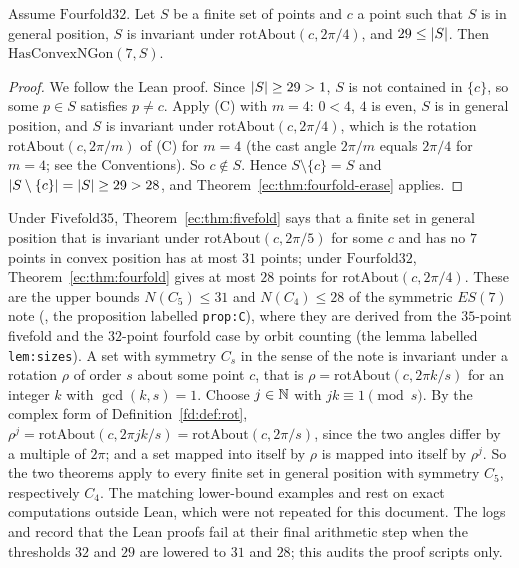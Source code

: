 \begin{theorem}\label{ec:thm:fourfold}
Assume $\mathrm{Fourfold32}$. Let $S$ be a finite set of points and $c$ a point such that $S$ is in general position,
$S$ is invariant under $\mathrm{rotAbout}(c,2\pi/4)$, and $29\le\lvert S\rvert$. Then $\mathrm{HasConvexNGon}(7,S)$.
\end{theorem}

\begin{proof}
We follow the Lean proof. Since $\lvert S\rvert\ge29>1$, $S$ is not contained in $\{c\}$, so some $p\in S$ satisfies $p\ne
c$. Apply (C) with $m=4$: $0<4$, $4$ is even, $S$ is in general position, and $S$ is invariant under
$\mathrm{rotAbout}(c,2\pi/4)$, which is the rotation $\mathrm{rotAbout}(c,2\pi/m)$ of (C) for $m=4$ (the cast angle
$2\pi/m$ equals $2\pi/4$ for $m=4$; see the Conventions). So $c\notin S$. Hence $S\setminus\{c\}=S$ and
$\lvert S\setminus\{c\}\rvert=\lvert S\rvert\ge29>28$, and
Theorem~\ref{ec:thm:fourfold-erase} applies.
\end{proof}

\begin{remark}\label{ec:rem:es7-sharp}
Under $\mathrm{Fivefold35}$, Theorem~\ref{ec:thm:fivefold} says that a finite set in general position that is
invariant under $\mathrm{rotAbout}(c,2\pi/5)$ for some $c$ and has no $7$ points in convex position has at most $31$
points; under $\mathrm{Fourfold32}$, Theorem~\ref{ec:thm:fourfold} gives at most $28$ points for
$\mathrm{rotAbout}(c,2\pi/4)$. These are the upper bounds $N(C_5)\le31$ and $N(C_4)\le28$ of the symmetric $ES(7)$
note (, the proposition labelled \texttt{prop:C}), where they are derived from
the $35$-point fivefold and the $32$-point fourfold case by orbit counting (the lemma labelled \texttt{lem:sizes}). A set
with symmetry $C_s$ in the sense of the note is invariant under a rotation $\rho$ of order $s$ about some point $c$,
that is $\rho=\mathrm{rotAbout}(c,2\pi k/s)$ for an integer $k$ with $\gcd(k,s)=1$. Choose $j\in\mathbb N$ with
$jk\equiv1\pmod s$. By the complex form of Definition~\ref{fd:def:rot},
$\rho^j=\mathrm{rotAbout}(c,2\pi jk/s)=\mathrm{rotAbout}(c,2\pi/s)$, since the two angles differ by a multiple of
$2\pi$; and a set mapped into itself by $\rho$ is mapped into itself by $\rho^j$. So the two theorems apply to every
finite set in general position with symmetry $C_5$, respectively $C_4$. The matching lower-bound examples  and
 rest on exact computations outside Lean, which were not repeated for this document. The
logs  and  record that the Lean proofs fail at their
final arithmetic step when the thresholds $32$ and $29$ are lowered to $31$ and $28$; this audits the proof scripts
only.
\end{remark}

